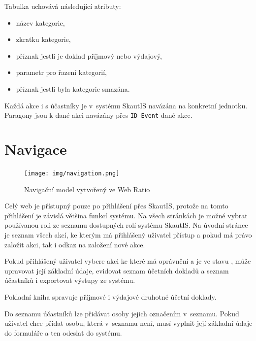 \documentclass[thesis=B,czech]{FITthesis}[2011/06/14]
\begin{document}
Tabulka  uchovává následující atributy:
 \begin{itemize}
 	\item název kategorie,
 	\item zkratku kategorie,
 	\item příznak jestli je doklad příjmový nebo výdajový,
 	\item parametr pro řazení kategorií,
 	\item příznak jestli byla kategorie smazána.
\end{itemize}

Každá akce i s účastníky je v~systému SkautIS navázána na konkretní jednotku. Paragony jsou k dané akci navázány přes \texttt{ID\_Event} dané akce. 

\section{Navigace}
 \begin{figure}[h] \centering
 	\texttt{[image: img/navigation.png]}
 	\caption[Navigační model]{Navigační model vytvořený ve Web Ratio}\label{fig:navigation-diagram}
 \end{figure}

Celý web je přístupný pouze po přihlášení přes SkautIS, protože na tomto přihlášení je závislá většina funkcí systému. Na všech stránkách je možné vybrat používanou roli ze seznamu dostupných rolí systému SkautIS. Na úvodní stránce je seznam všech akcí, ke kterým má přihlášený uživatel přístup a pokud má právo založit akci, tak i odkaz na založení nové akce.

Pokud přihlášený uživatel vybere akci ke které má oprávnění a je ve stavu , může upravovat její základní údaje, evidovat seznam účetních dokladů a seznam účastníků i exportovat výstupy ze systému.

Pokladní kniha spravuje příjmové i výdajové druhotné účetní doklady. 

Do seznamu účastníků lze přidávat osoby jejich označením v~seznamu. Pokud uživatel chce přidat osobu, která v~seznamu není, musí vyplnit její základní údaje do formuláře a ten odeslat do systému.
\end{document}
